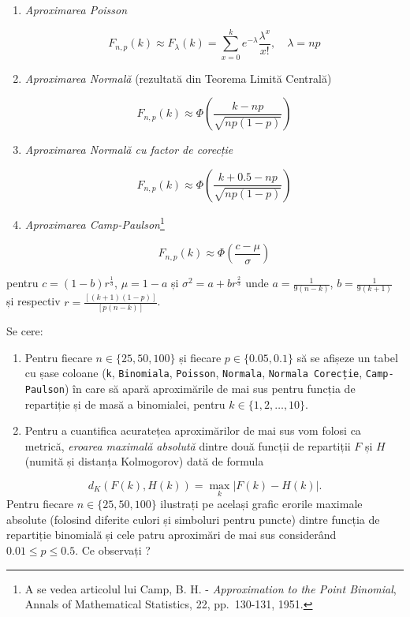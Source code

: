 \documentclass[]{article}
\let\rmarkdownfootnote\footnote%
\def\footnote{\protect\rmarkdownfootnote}
\begin{document}
\begin{enumerate}
\def\labelenumi{\alph{enumi})}
\item
  \emph{Aproximarea Poisson}

  \[
    F_{n,p}(k) \approx F_{\lambda}(k)=\sum_{x=0}^{k}e^{-\lambda}\frac{\lambda^x}{x!}, \quad \lambda = np
  \]
\item
  \emph{Aproximarea Normală} (rezultată din Teorema Limită Centrală)

  \[
    F_{n,p}(k) \approx \Phi\left(\frac{k-np}{\sqrt{np(1-p)}}\right)
  \]
\item
  \emph{Aproximarea Normală cu factor de corecție}

  \[
    F_{n,p}(k) \approx \Phi\left(\frac{k+0.5-np}{\sqrt{np(1-p)}}\right)
  \]
\item
  \emph{Aproximarea Camp-Paulson}\footnote{A se vedea articolul lui
    Camp, B. H. - \emph{Approximation to the Point Binomial}, Annals of
    Mathematical Statistics, 22, pp.~130-131, 1951.}

  \[
    F_{n,p}(k) \approx \Phi\left(\frac{c-\mu}{\sigma}\right)
  \]
\end{enumerate}

pentru \(c = (1-b)r^{\frac{1}{3}}\), \(\mu = 1-a\) și
\(\sigma^2 = a+br^{\frac{2}{3}}\) unde \(a = \frac{1}{9(n-k)}\),
\(b = \frac{1}{9(k+1)}\) și respectiv
\(r = \frac{[(k+1)(1-p)]}{[p(n-k)]}\).

Se cere:

\begin{enumerate}
\def\labelenumi{\arabic{enumi}.}
\setcounter{enumi}{3}
\item
  Pentru fiecare \(n\in\{25, 50, 100\}\) și fiecare
  \(p\in\{0.05, 0.1\}\) să se afișeze un tabel cu șase coloane
  (\texttt{k}, \texttt{Binomiala}, \texttt{Poisson}, \texttt{Normala},
  \texttt{Normala\ Corecție}, \texttt{Camp-Paulson}) în care să apară
  aproximările de mai sus pentru funcția de repartiție și de masă a
  binomialei, pentru \(k\in\{1,2,\ldots, 10\}\).
\item
  Pentru a cuantifica acuratețea aproximărilor de mai sus vom folosi ca
  metrică, \emph{eroarea maximală absolută} dintre două funcții de
  repartiții \(F\) și \(H\) (numită și distanța Kolmogorov) dată de
  formula
\end{enumerate}

\[
    d_K(F(k), H(k)) = \max_{k}\left|F(k) - H(k)\right|.
  \] Pentru fiecare \(n\in\{25, 50, 100\}\) ilustrați pe același grafic
erorile maximale absolute (folosind diferite culori și simboluri pentru
puncte) dintre funcția de repartiție binomială și cele patru aproximări
de mai sus considerând \(0.01\leq p\leq 0.5\). Ce observați ?
\end{document}
